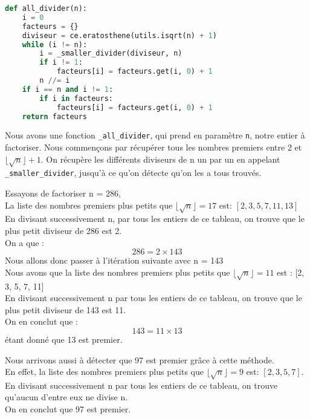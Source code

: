\newpage
\begin{lstlisting}[language=Python]
def all_divider(n):
    i = 0
    facteurs = {}
    diviseur = ce.eratosthene(utils.isqrt(n) + 1)
    while (i != n):
        i = _smaller_divider(diviseur, n)
        if i != 1:
            facteurs[i] = facteurs.get(i, 0) + 1
        n //= i
    if i == n and i != 1:
        if i in facteurs:
            facteurs[i] = facteurs.get(i, 0) + 1
    return facteurs
\end{lstlisting}
\vspace{1em}
Nous avons une fonction \lstinline{_all_divider}, qui prend en paramètre \lstinline{n}, notre entier à factoriser.
Nous commençons par récupérer tous les nombres premiers entre 2 et $\lfloor \sqrt{n} \rfloor + 1$.
On récupère les différents diviseurs de n un par un en appelant \lstinline{_smaller_divider}, jusqu'à ce qu'on détecte qu'on les a tous trouvés.

\begin{example}
    Essayons de factoriser n = 286,\\
    La liste des nombres premiers plus petits que $\lfloor \sqrt{n} \rfloor = 17$ est: $[2, 3, 5, 7, 11, 13]$ \\
    En divisant successivement n, par tous les entiers de ce tableau, on trouve que le plus petit diviseur de 286 est 2. \\
    On a que : \[286 = 2 \times 143\]
    Nous allons donc passer à l'itération suivante avec n = 143\\
    Nous avons que la liste des nombres premiers plus petits que $\lfloor \sqrt{n} \rfloor = 11$ est : [2, 3, 5, 7, 11] \\
    En divisant successivement n par tous les entiers de ce tableau, on trouve que le plus petit diviseur de 143 est 11. \\
    On en conclut que :
        \[143 = 11 \times 13\]
    étant donné que 13 est premier.

\end{example}

\begin{example}
    Nous arrivons aussi à détecter que 97 est premier grâce à cette méthode.\\
    En effet, la liste des nombres premiers plus petits que $\lfloor \sqrt{n} \rfloor = 9$ est: $[2, 3, 5, 7]$.\\
    En divisant successivement n par tous les entiers de ce tableau, on trouve qu'aucun d'entre eux ne divise n.\\
    On en conclut que 97 est premier.
\end{example}
